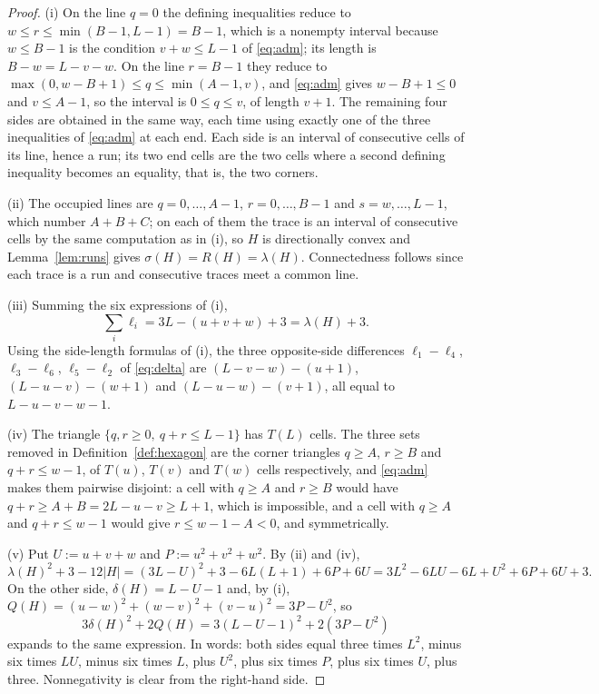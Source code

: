 \documentclass[11pt]{article}
\theoremstyle{plain}
\theoremstyle{definition}
\theoremstyle{remark}
\begin{document}
\begin{proof}
(i) On the line \(q=0\) the defining inequalities reduce to \(w\le r\le\min(B-1,L-1)=B-1\),
which is a nonempty interval because \(w\le B-1\) is the condition \(v+w\le L-1\) of
\eqref{eq:adm}; its length is \(B-w=L-v-w\). On the line \(r=B-1\) they reduce to
\(\max(0,w-B+1)\le q\le\min(A-1,v)\), and \eqref{eq:adm} gives \(w-B+1\le0\) and
\(v\le A-1\), so the interval is \(0\le q\le v\), of length \(v+1\). The remaining four
sides are obtained in the same way, each time using exactly one of the three inequalities
of \eqref{eq:adm} at each end. Each side is an interval of consecutive cells of its line,
hence a run; its two end cells are the two cells where a second defining inequality becomes
an equality, that is, the two corners.

(ii) The occupied lines are \(q=0,\dots,A-1\), \(r=0,\dots,B-1\) and \(s=w,\dots,L-1\),
which number \(A+B+C\); on each of them the trace is an interval of consecutive cells by
the same computation as in (i), so \(H\) is directionally convex and
Lemma~\ref{lem:runs} gives \(\sigma(H)=R(H)=\lambda(H)\). Connectedness follows since each
trace is a run and consecutive traces meet a common line.

(iii) Summing the six expressions of (i),
\[
   \sum_{i}\ell_{i}=3L-(u+v+w)+3=\lambda(H)+3 .
\]
Using the side-length formulas of (i), the three opposite-side differences
\(\ell_{1}-\ell_{4}\), \(\ell_{3}-\ell_{6}\), \(\ell_{5}-\ell_{2}\) of \eqref{eq:delta}
are \((L-v-w)-(u+1)\), \((L-u-v)-(w+1)\) and \((L-u-w)-(v+1)\), all equal to
\(L-u-v-w-1\).

(iv) The triangle \(\{q,r\ge0,\ q+r\le L-1\}\) has \(T(L)\) cells. The three sets removed
in Definition~\ref{def:hexagon} are the corner triangles \(q\ge A\), \(r\ge B\) and
\(q+r\le w-1\), of \(T(u)\), \(T(v)\) and \(T(w)\) cells respectively, and \eqref{eq:adm}
makes them pairwise disjoint: a cell with \(q\ge A\) and \(r\ge B\) would have
\(q+r\ge A+B=2L-u-v\ge L+1\), which is impossible, and a cell with \(q\ge A\) and
\(q+r\le w-1\) would give \(r\le w-1-A<0\), and symmetrically.

(v) Put \(U:=u+v+w\) and \(P:=u^{2}+v^{2}+w^{2}\). By (ii) and (iv),
\[
   \lambda(H)^{2}+3-12|H|=(3L-U)^{2}+3-6L(L+1)+6P+6U
   =3L^{2}-6LU-6L+U^{2}+6P+6U+3 .
\]
On the other side, \(\delta(H)=L-U-1\) and, by (i),
\(Q(H)=(u-w)^{2}+(w-v)^{2}+(v-u)^{2}=3P-U^{2}\), so
\[
   3\delta(H)^{2}+2Q(H)=3(L-U-1)^{2}+2(3P-U^{2})
\]
expands to the same expression. In words: both sides equal three times \(L^{2}\), minus six
times \(LU\), minus six times \(L\), plus \(U^{2}\), plus six times \(P\), plus six times
\(U\), plus three. Nonnegativity is clear from the right-hand side.
\end{proof}
\end{document}
